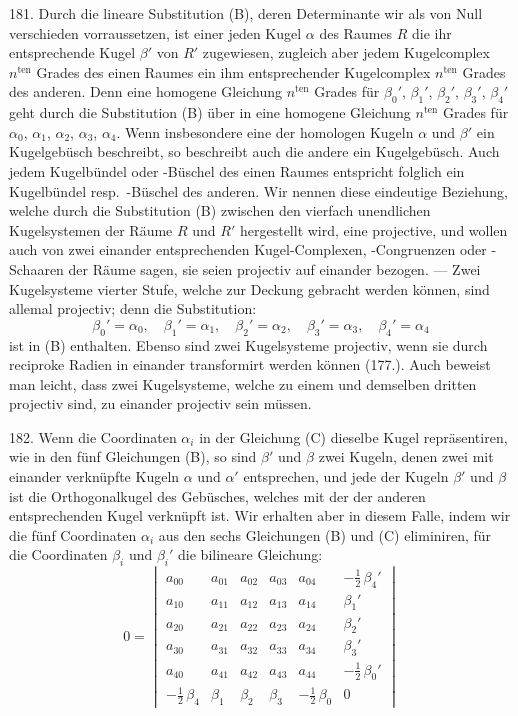 181. Durch die lineare Substitution (B), deren Determinante
wir als von Null verschieden vorraussetzen, %
ist einer jeden Kugel $\alpha$ des Raumes $R$ die ihr entsprechende Kugel $\beta'$
von $R'$ zugewiesen, zugleich aber jedem Kugelcomplex $n^{\text{ten}}$
Grades des einen Raumes ein ihm entsprechender Kugelcomplex
$n^{\text{ten}}$ Grades des anderen. Denn eine homogene Gleichung
$n^{\text{ten}}$ Grades f\"ur $\beta_0'$, $\beta_1'$, $\beta_2'$, $\beta_3'$, $\beta_4'$ geht durch die
Substitution (B) \"uber in eine homogene Gleichung $n^{\text{ten}}$ Grades
f\"ur $\alpha_0$, $\alpha_1$, $\alpha_2$, $\alpha_3$, $\alpha_4$. Wenn insbesondere eine der
homologen Kugeln $\alpha$ und $\beta'$ ein Kugelgeb\"usch beschreibt, so
beschreibt auch die andere ein Kugelgeb\"usch. Auch jedem
Kugelb\"undel oder -B\"uschel des einen Raumes entspricht
folglich ein Kugelb\"undel resp.\ -B\"uschel des anderen. Wir
nennen diese eindeutige Beziehung, welche durch die Substitution
(B) zwischen den vierfach unendlichen Kugelsystemen
der R\"aume $R$ und $R'$ hergestellt wird, eine {\glqq}projective{\grqq},
und wollen auch von zwei einander entsprechenden Kugel-Complexen,
-Congruenzen oder -Schaaren der R\"aume sagen,
sie seien {\glqq}projectiv{\grqq} auf einander bezogen. --- Zwei Kugelsysteme
vierter Stufe, welche zur Deckung gebracht werden
k\"onnen, sind allemal projectiv; denn die Substitution:
\[
  \beta_0'=\alpha_0,\quad
  \beta_1'=\alpha_1,\quad
  \beta_2'=\alpha_2,\quad
  \beta_3'=\alpha_3,\quad
  \beta_4'=\alpha_4
\]
ist in (B) enthalten. Ebenso sind zwei Kugelsysteme projectiv,
wenn sie durch reciproke Radien in einander transformirt
werden k\"onnen (177.). Auch beweist man leicht,
dass zwei Kugelsysteme, welche zu einem und demselben
dritten projectiv sind, zu einander projectiv sein m\"ussen.

182. Wenn die Coordinaten $\alpha_i$ in der Gleichung (C)
dieselbe Kugel repr\"asentiren, wie in den f\"unf Gleichungen (B),
so sind $\beta'$ und $\beta$ zwei Kugeln, denen zwei mit einander
verkn\"upfte Kugeln $\alpha$ und $\alpha'$ entsprechen, und jede der Kugeln $\beta'$
und $\beta$ ist die Orthogonalkugel des Geb\"usches, welches mit
der der anderen entsprechenden Kugel verkn\"upft ist. Wir
erhalten aber in diesem Falle, indem wir die f\"unf Coordinaten
$\alpha_i$ aus den sechs Gleichungen (B) und (C) eliminiren,
f\"ur die Coordinaten $\beta_i$ und $\beta_i'$ die bilineare Gleichung:
\[
\tag*{(D)}
0=
\begin{vmatrix}
a_{00} & a_{01} & a_{02} & a_{03} & a_{04} & - \frac{1}{2}\,\beta_4' \\
a_{10} & a_{11} & a_{12} & a_{13} & a_{14} &                \beta_1' \\
a_{20} & a_{21} & a_{22} & a_{23} & a_{24} &                \beta_2' \\
a_{30} & a_{31} & a_{32} & a_{33} & a_{34} &                \beta_3' \\
a_{40} & a_{41} & a_{42} & a_{43} & a_{44} & - \frac{1}{2}\,\beta_0' \\
- \frac{1}{2}\,\beta_4 & \beta_1 & \beta_2 & \beta_3 & - \frac{1}{2}\,\beta_0 & 0
\end{vmatrix}
\]

